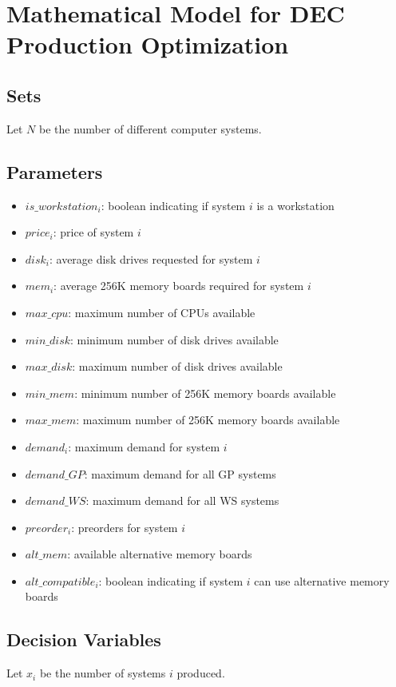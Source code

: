 \documentclass{article}
\begin{document}
\section*{Mathematical Model for DEC Production Optimization}

\subsection*{Sets}
Let \( N \) be the number of different computer systems.

\subsection*{Parameters}
\begin{itemize}
    \item \( is\_workstation_i \): boolean indicating if system \( i \) is a workstation
    \item \( price_i \): price of system \( i \)
    \item \( disk_i \): average disk drives requested for system \( i \)
    \item \( mem_i \): average 256K memory boards required for system \( i \)
    \item \( max\_cpu \): maximum number of CPUs available
    \item \( min\_disk \): minimum number of disk drives available
    \item \( max\_disk \): maximum number of disk drives available
    \item \( min\_mem \): minimum number of 256K memory boards available
    \item \( max\_mem \): maximum number of 256K memory boards available
    \item \( demand_i \): maximum demand for system \( i \)
    \item \( demand\_GP \): maximum demand for all GP systems
    \item \( demand\_WS \): maximum demand for all WS systems
    \item \( preorder_i \): preorders for system \( i \)
    \item \( alt\_mem \): available alternative memory boards
    \item \( alt\_compatible_i \): boolean indicating if system \( i \) can use alternative memory boards
\end{itemize}

\subsection*{Decision Variables}
Let \( x_i \) be the number of systems \( i \) produced.
\end{document}
